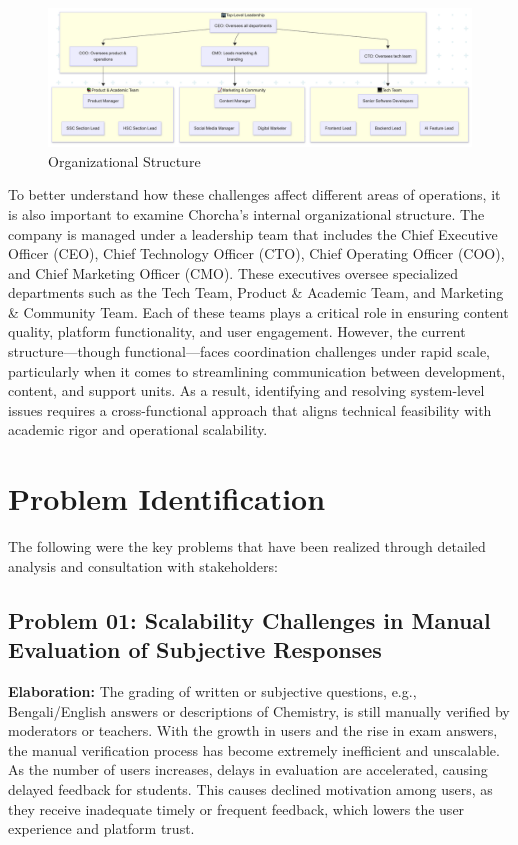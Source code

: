 \documentclass[12pt,a4paper,oneside]{book}
\begin{document}
\begin{figure}[H]
    \centering
    \includegraphics[width=1.0\textwidth]{flowChart4.png}
    \caption{Organizational Structure}
\end{figure}

To better understand how these challenges affect different areas of operations, it is also important to examine Chorcha's internal organizational structure. The company is managed under a leadership team that includes the Chief Executive Officer (CEO), Chief Technology Officer (CTO), Chief Operating Officer (COO), and Chief Marketing Officer (CMO). These executives oversee specialized departments such as the Tech Team, Product \& Academic Team, and Marketing \& Community Team. Each of these teams plays a critical role in ensuring content quality, platform functionality, and user engagement. However, the current structure—though functional—faces coordination challenges under rapid scale, particularly when it comes to streamlining communication between development, content, and support units. As a result, identifying and resolving system-level issues requires a cross-functional approach that aligns technical feasibility with academic rigor and operational scalability.

\newpage

\section{Problem Identification}
The following were the key problems that have been realized through detailed analysis and consultation with stakeholders:

\subsection{Problem 01: Scalability Challenges in Manual Evaluation of Subjective Responses}
\textbf{Elaboration:} The grading of written or subjective questions, e.g., Bengali/English answers or descriptions of Chemistry, is still manually verified by moderators or teachers. With the growth in users and the rise in exam answers, the manual verification process has become extremely inefficient and unscalable. As the number of users increases, delays in evaluation are accelerated, causing delayed feedback for students. This causes declined motivation among users, as they receive inadequate timely or frequent feedback, which lowers the user experience and platform trust.
\end{document}
